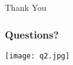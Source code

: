 \documentclass[10pt]{beamer}
\begin{document}
\begin{frame}
  \begin{center}
    \Huge{Thank You}
  \end{center}
\end{frame}

\begin{frame}
	\frametitle{Questions?}
	\begin{center}
	\texttt{[image: q2.jpg]}
	\end{center}
\end{frame}

\end{document}
